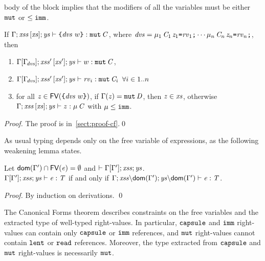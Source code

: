 {body of the block implies that the modifiers of all the variables must be either $\texttt{mut}$ or $\leq\texttt{imm}$.
\begin{lemma}\label{lemma:blockMut}
If $\Gamma;\mathit{xss}\,[\mathit{xs}];\mathit{ys}\vdash \texttt{\{}\mathit{dvs}\ {w}\texttt{\}}:\texttt{mut}\,\mathit{C}$, where
$\mathit{dvs}=\mu_1\,\mathit{C}_1\,\mathit{z}_1\texttt{=}\mathit{rv}_1\texttt{;}\cdots\mu_n\,\mathit{C}_n\,\mathit{z}_n\texttt{=}\mathit{rv}_n\texttt{;}$, then
  \begin{enumerate}
  \item $\Gamma[\Gamma_{\!\mathit{dvs}}];{\mathit{xss}'}\,[\mathit{xs}'];\mathit{ys}\vdash {w}:\texttt{mut}\,\mathit{C}$,
  \item $\Gamma[\Gamma_{\!\mathit{dvs}}];{\mathit{xss}'}\,[\mathit{xs}'];\mathit{ys}\vdash \mathit{rv}_i:\texttt{mut}\,\mathit{C}_i$ 
  $\forall i\in1..n$ 
\item for all $\mathit{z}\in\textsf{FV}(\texttt{\{}\mathit{dvs}\ w\texttt{\}})$, if $\Gamma(\mathit{z})=\texttt{mut}\,\mathit{D}$, then $\mathit{z}\in\mathit{xs}$, otherwise 
$\Gamma;\mathit{xss}\,[\mathit{xs}];\mathit{ys}\vdash z:\mu\,\mathit{C}$ with $\mu\leq\texttt{imm}$.
\end{enumerate}
\end{lemma}
\begin{proof}
The proof is in~\ref{sect:proof-cf}.\qed
\end{proof}
As usual typing depends only on the free variable of expressions, as the following weakening lemma states.
\begin{lemma}[Weakening]\label{lemma:weakening}
Let $\textsf{dom}(\Gamma')\cap\textsf{FV}(\mathit{e})=\emptyset$ and $\vdash\Gamma[\Gamma'];{\mathit{xss}};\mathit{ys}$. \\
$\Gamma[\Gamma'];\mathit{xss};\mathit{ys}\vdash \mathit{e}:\mathit{T}$ if and
only if  ${\Gamma};{\mathit{xss}}{\setminus}{{\textsf{dom}(\Gamma')}};{\mathit{ys}}{\setminus}{{\textsf{dom}(\Gamma')}}\vdash \mathit{e}:\mathit{T}$.
\end{lemma}
\begin{proof}
By induction on derivations. \qed
\end{proof}
The Canonical Forms theorem describes constraints on the free variables and the extracted type of well-typed right-values. In particular, $\texttt{capsule}$ and $\texttt{imm}$ right-values can contain only $\texttt{capsule}$ or $\texttt{imm}$ references, and 
$\texttt{mut}$ right-values cannot contain $\texttt{lent}$ or $\texttt{read}$ references. Moreover, the type extracted from $\texttt{capsule}$ and $\texttt{mut}$ right-values is necessarily $\texttt{mut}$.  
\begin{theorem}\label{theo:canonicalForm}

\end{theorem}}

